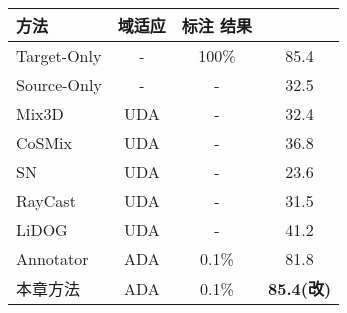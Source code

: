 \begin{table}[H]
	\renewcommand{\arraystretch}{1}
    \centering
    \setlength{\tabcolsep}{12mm}
    \label{tab:3-4}
    \wuhao
    \begin{tabular}{lccc}
        \toprule[1.5pt]
        \textbf{方法} & \textbf{域适应} & \textbf{标注} \textbf{结果} \\
        \midrule
        Target-Only   & -       & 100\%           & 85.4 \\
        Source-Only   & -       & -           & 32.5 \\
        Mix3D         & UDA     & -   & 32.4 \\
        CoSMix        & UDA     & -   & 36.8 \\
        SN              & UDA   & -     & 23.6 \\
        RayCast        & UDA    & -    & 31.5 \\
        LiDOG        & UDA      & -       & 41.2 \\
        Annotator     & ADA     & 0.1\%     & 81.8 \\
        本章方法       & ADA    & 0.1\%      & \textbf{85.4(改)} \\
        \bottomrule[1.5pt]
    \end{tabular}
\end{table}